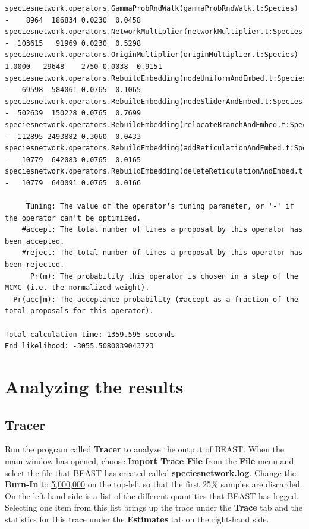 \documentclass[11pt]{article}
\begin{document}
{\begin{verbatim}
speciesnetwork.operators.GammaProbRndWalk(gammaProbRndWalk.t:Species)           -    8964  186834 0.0230  0.0458 
speciesnetwork.operators.NetworkMultiplier(networkMultiplier.t:Species)         -  103615   91969 0.0230  0.5298 
speciesnetwork.operators.OriginMultiplier(originMultiplier.t:Species)      1.0000   29648    2750 0.0038  0.9151 
speciesnetwork.operators.RebuildEmbedding(nodeUniformAndEmbed.t:Species)        -   69598  584061 0.0765  0.1065 
speciesnetwork.operators.RebuildEmbedding(nodeSliderAndEmbed.t:Species)         -  502639  150228 0.0765  0.7699 
speciesnetwork.operators.RebuildEmbedding(relocateBranchAndEmbed.t:Species)     -  112895 2493882 0.3060  0.0433 
speciesnetwork.operators.RebuildEmbedding(addReticulationAndEmbed.t:Species)    -   10779  642083 0.0765  0.0165 
speciesnetwork.operators.RebuildEmbedding(deleteReticulationAndEmbed.t:Species) -   10779  640091 0.0765  0.0166 

     Tuning: The value of the operator's tuning parameter, or '-' if the operator can't be optimized.
    #accept: The total number of times a proposal by this operator has been accepted.
    #reject: The total number of times a proposal by this operator has been rejected.
      Pr(m): The probability this operator is chosen in a step of the MCMC (i.e. the normalized weight).
  Pr(acc|m): The acceptance probability (#accept as a fraction of the total proposals for this operator).

Total calculation time: 1359.595 seconds
End likelihood: -3055.5080039043723
\end{verbatim}}

\section*{Analyzing the results}

\subsection*{Tracer}

Run the program called \textbf{Tracer} to analyze the output of BEAST. When the main window has opened, choose \textbf{Import Trace File} from the \textbf{File} menu and select the file that BEAST has created called \textbf{speciesnetwork.log}. Change the \textbf{Burn-In} to \underline{5,000,000} on the top-left so that the first 25\% samples are discarded.
On the left-hand side is a list of the different quantities that BEAST has logged. Selecting one item from this list brings up the trace under the \textbf{Trace} tab and the statistics for this trace under the \textbf{Estimates} tab on the right-hand side.
\end{document}
